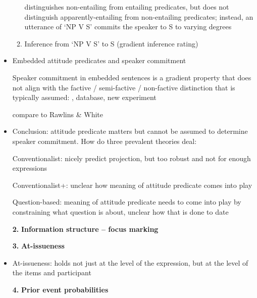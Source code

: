 \documentclass[11pt,fleqn]{article}
\newcommand{\6}{\mbox{$[\hspace*{-.6mm}[$}}
\newcommand{\9}{\mbox{$]\hspace*{-.6mm}]$}}
\begin{document}
\begin{itemize}[leftmargin=3ex,topsep=0pt,itemsep=-2pt]
\begin{enumerate}
distinguishes non-entailing from entailing predicates, but does not distinguish apparently-entailing from non-entailing predicates; instead, an utterance of `NP V S' commits the speaker to S to varying degrees

\item Inference from `NP V S' to S (gradient inference rating)

\end{enumerate}

\item Embedded attitude predicates and speaker commitment

Speaker commitment in embedded sentences is a gradient property that does not align with the factive / semi-factive / non-factive distinction that is typically assumed: \citealt{tbd-variability}, database, new experiment

compare to Rawlins \& White

\item Conclusion: attitude predicate matters but cannot be assumed to determine speaker commitment. How do three prevalent theories deal:

Conventionalist: nicely predict projection, but too robust and not for enough expressions

Conventionalist+: unclear how meaning of attitude predicate comes into play

Question-based: meaning of attitude predicate needs to come into play by constraining what question is about, unclear how that is done to date

\item[{\bf 2.}] {\bf Information structure -- focus marking}

\item[{\bf 3.}] {\bf At-issueness}

\item At-issueness: holds not just at the level of the expression, but at the level of the items and participant

\item[{\bf 4.}] {\bf Prior event probabilities}

\end{itemize}



\end{document}
